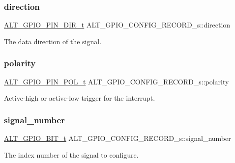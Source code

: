 \subsubsection{\texorpdfstring{direction}{direction}}
{\footnotesize\ttfamily \mbox{\hyperlink{group__ALT__GPIO__API__CONFIG_ga96132f0cfe4bb0ffc0f9ec8a392a45f3}{A\+L\+T\+\_\+\+G\+P\+I\+O\+\_\+\+P\+I\+N\+\_\+\+D\+I\+R\+\_\+t}} A\+L\+T\+\_\+\+G\+P\+I\+O\+\_\+\+C\+O\+N\+F\+I\+G\+\_\+\+R\+E\+C\+O\+R\+D\+\_\+s\+::direction}

The data direction of the signal. \mbox{\label{structALT__GPIO__CONFIG__RECORD__s_a00b93306325650bcd69af38e1b1ce9bf}} 
\subsubsection{\texorpdfstring{polarity}{polarity}}
{\footnotesize\ttfamily \mbox{\hyperlink{group__ALT__GPIO__API__CONFIG_gac97da06ff658611bcd2b12753dfc4a10}{A\+L\+T\+\_\+\+G\+P\+I\+O\+\_\+\+P\+I\+N\+\_\+\+P\+O\+L\+\_\+t}} A\+L\+T\+\_\+\+G\+P\+I\+O\+\_\+\+C\+O\+N\+F\+I\+G\+\_\+\+R\+E\+C\+O\+R\+D\+\_\+s\+::polarity}

Active-\/high or active-\/low trigger for the interrupt. \mbox{\label{structALT__GPIO__CONFIG__RECORD__s_a6ca553642a90fdcc8ce978feda1bd747}} 
\subsubsection{\texorpdfstring{signal\_number}{signal\_number}}
{\footnotesize\ttfamily \mbox{\hyperlink{group__ALT__GPIO__BITVIEW_ga6d149a5961bef8b91b8108e3838b1e09}{A\+L\+T\+\_\+\+G\+P\+I\+O\+\_\+B\+I\+T\+\_\+t}} A\+L\+T\+\_\+\+G\+P\+I\+O\+\_\+\+C\+O\+N\+F\+I\+G\+\_\+\+R\+E\+C\+O\+R\+D\+\_\+s\+::signal\+\_\+number}

The index number of the signal to configure. \mbox{\label{structALT__GPIO__CONFIG__RECORD__s_a132d01ef65fc88334a623858ea73445f}} 
